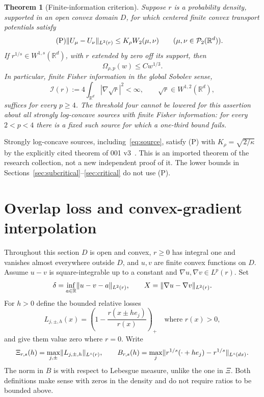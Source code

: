 \documentclass[11pt]{article}
\newtheorem{theorem}{Theorem}[section]
\theoremstyle{remark}\newtheorem{remark}[theorem]{Remark}
\newcommand{\R}{\mathbb R}\newcommand{\E}{\mathbb E}
\newcommand{\Ptwo}{\mathcal P_2}\newcommand{\eps}{\varepsilon}
\begin{document}
\begin{theorem}[Finite-information criterion]\label{thm:fisher}
Suppose $r$ is a probability density, supported in an open convex domain $D$, for which centered finite convex transport potentials satisfy
\begin{equation}\tag{P}\label{eq:P}
 \norm{U_\mu-U_\nu}_{L^2(r)}\le K_\rho W_2(\mu,\nu)
 \qquad(\mu,\nu\in\Ptwo(\R^d)).
\end{equation}
If $r^{1/s}\in W^{1,s}(\R^d)$, with $r$ extended by zero off its support, then
\[
 \Omega_{\rho,p}(w)\le C w^{1/3}.
\]
In particular, finite Fisher information in the global Sobolev sense,
\[
 \mathcal I(r):=4\int_{\R^d}|\nabla\sqrt r|^2<\infty,
 \qquad\sqrt r\in W^{1,2}(\R^d),
\]
suffices for every $p\ge4$. The threshold four cannot be lowered for this assertion about all strongly log-concave sources with finite Fisher information: for every $2<p<4$ there is a fixed such source for which a one-third bound fails.
\end{theorem}

Strongly log-concave sources, including~\eqref{eq:source}, satisfy (P) with $K_\rho=\sqrt{2/\kappa}$ by the explicitly cited theorem of 001 v3~\cite{M001}. This is an imported theorem of the research collection, not a new independent proof of it. The lower bounds in Sections~\ref{sec:subcritical}--\ref{sec:critical} do not use (P).

\section{Overlap loss and convex-gradient interpolation}\label{sec:overlap}
Throughout this section $D$ is open and convex, $r\ge0$ has integral one and vanishes almost everywhere outside $D$, and $u,v$ are finite convex functions on $D$. Assume $u-v$ is square-integrable up to a constant and $\nabla u,\nabla v\in L^p(r)$. Set
\[
 \delta=\inf_{a\in\R}\norm{u-v-a}_{L^2(r)},\qquad
 X=\norm{\nabla u-\nabla v}_{L^2(r)}.
\]
For $h>0$ define the bounded relative losses
\[
 L_{j,\pm,h}(x)=\left(1-\frac{r(x\pm he_j)}{r(x)}\right)_+
 \quad\text{where }r(x)>0,
\]
and give them value zero where $r=0$. Write
\[
 \Xi_{r,s}(h)=\max_{j,\pm}\lVert L_{j,\pm,h}\rVert_{L^s(r)},\qquad
 B_{r,s}(h)=\max_j\lVert r^{1/s}(\cdot+he_j)-r^{1/s}\rVert_{L^s(dx)}.
\]
The norm in $B$ is with respect to Lebesgue measure, unlike the one in $\Xi$. Both definitions make sense with zeros in the density and do not require ratios to be bounded above.
\end{document}
